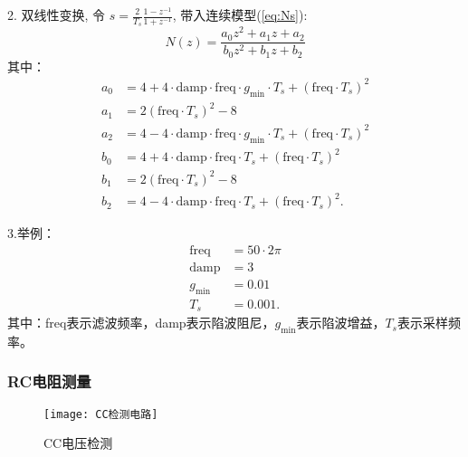        2. 双线性变换, 令 $s = \frac{2}{T_s}\frac{1-z^{-1}}{1+z^{-1}}$, 带入连续模型(\ref{eq:Ns}):
         \begin{equation}
            N(z) = \frac{a_0z^2+a_1z+a_2}{b_0z^2+b_1z+b_2}
         \end{equation}
         其中：
        \begin{equation}
            \begin{aligned}
                a_0 &= 4 + 4 \cdot \text{damp} \cdot \text{freq} \cdot g_\text{min} \cdot T_s + (\text{freq} \cdot T_s)^2\\
                a_1 &= 2 (\text{freq} \cdot T_s)^2 -8 \\
                a_2 &= 4 - 4 \cdot \text{damp} \cdot \text{freq} \cdot g_\text{min} \cdot T_s + (\text{freq} \cdot T_s)^2\\
                b_0 &= 4 + 4 \cdot \text{damp} \cdot \text{freq}  \cdot T_s + (\text{freq} \cdot T_s)^2\\
                b_1 &= 2 (\text{freq} \cdot T_s)^2 -8 \\
                b_2 &= 4 - 4 \cdot \text{damp} \cdot \text{freq}  \cdot T_s + (\text{freq} \cdot T_s)^2.
            \end{aligned}
        \end{equation}

        3.举例：
        \begin{equation}
            \begin{aligned}
                \text{freq} &= 50\cdot2\pi\\
                \text{damp} &= 3 \\
                g_\text{min} &= 0.01\\
                T_s &= 0.001.
            \end{aligned}
        \end{equation}
        其中：freq表示滤波频率，damp表示陷波阻尼，$g_\text{min}$表示陷波增益，$T_s$表示采样频率。


        \subsubsection*{RC电阻测量}
            \begin{figure}[H]
                \centering
                \texttt{[image: CC检测电路]}
                \caption{CC电压检测}
                \label{fig:C13}
            \end{figure}


